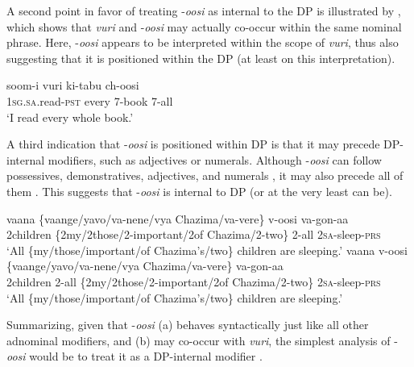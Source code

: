 \documentclass[output=paper]{langsci/langscibook}
\begin{document}
A second point in favor of treating -\textit{oosi} as internal to the DP is illustrated by , which shows that \textit{vuri} and -\textit{oosi} may actually co-occur within the same nominal phrase. Here, -\textit{oosi} appears to be interpreted within the scope of \textit{vuri}, thus also suggesting that it is positioned within the DP (at least on this interpretation).

\ea\label{ex:landman:24}
\gll soom-i      vuri    ki-tabu  ch-oosi\\
     1\textsc{sg.sa}.read-\textsc{pst}  every    7-book  7-all \\
\glt ‘I read every whole book.’
\z

A third indication that -\textit{oosi} is positioned within DP is that it may precede DP-internal modifiers, such as adjectives or numerals. Although -\textit{oosi} can follow possessives, demonstratives, adjectives, and numerals , it may also precede all of them . This suggests that -\textit{oosi} is internal to DP (or at the very least can be). 

\ea\label{ex:landman:25} 
\ea\label{ex:landman:25a} 
\gll vaana  \textup{\{}vaange\textup{/}yavo\textup{/}va-nene/vya Chazima/va-vere\}  v-oosi  va-gon-aa\\
     2children  \{2my/2those/2-important/2of Chazima/2-two\}  2-all  2\textsc{sa}-sleep-\textsc{prs}\\
\glt `All \{my/those/important/of Chazima's/two\} children are sleeping.'  
\ex\label{ex:landman:25b}
\gll vaana  v-oosi\textup{   \{}vaange\textup{/}yavo\textup{/}va-nene/vya Chazima/va-vere\}  va-gon-aa\\
     2children  2-all   \{2my/2those/2-important/2of Chazima/2-two\}  2\textsc{sa}-sleep-\textsc{prs}\\
\glt     `All \{my/those/important/of Chazima's/two\} children are sleeping.'  \\
\z
\z

  Summarizing, given that -\textit{oosi} (a) behaves syntactically just like all other adnominal modifiers, and (b) may co-occur with \textit{vuri}, the simplest analysis of -\textit{oosi} would be to treat it as a DP-internal modifier .
\end{document}
